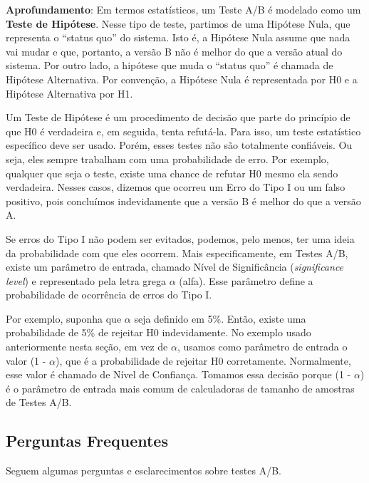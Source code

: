 \documentclass[
  11pt,
  twoside]{book}
\newenvironment{esmbox}{\centering \vspace{1.5ex} \begin{tcolorbox}[breakable, colback=backcolor, width=4.9in]}{\end{tcolorbox} \vspace{1.5ex}}
\begin{document}
\begin{esmbox}

\textbf{Aprofundamento}: Em termos estatísticos, um Teste A/B é modelado
como um \textbf{Teste de Hipótese}. Nesse tipo de teste, partimos de uma
Hipótese Nula, que representa o ``status quo'' do sistema. Isto é, a
Hipótese Nula assume que nada vai mudar e que, portanto, a versão B não
é melhor do que a versão atual do sistema. Por outro lado, a hipótese
que muda o ``status quo'' é chamada de Hipótese Alternativa. Por
convenção, a Hipótese Nula é representada por H0 e a Hipótese
Alternativa por H1.

Um Teste de Hipótese é um procedimento de decisão que parte do princípio
de que H0 é verdadeira e, em seguida, tenta refutá-la. Para isso, um
teste estatístico específico deve ser usado. Porém, esses testes não são
totalmente confiáveis. Ou seja, eles sempre trabalham com uma
probabilidade de erro. Por exemplo, qualquer que seja o teste, existe
uma chance de refutar H0 mesmo ela sendo verdadeira. Nesses casos,
dizemos que ocorreu um Erro do Tipo I ou um falso positivo, pois
concluímos indevidamente que a versão B é melhor do que a versão A.

Se erros do Tipo I não podem ser evitados, podemos, pelo menos, ter uma
ideia da probabilidade com que eles ocorrem. Mais especificamente, em
Testes A/B, existe um parâmetro de entrada, chamado Nível de
Significância (\emph{significance level}) e representado pela letra
grega \(\alpha\) (alfa). Esse parâmetro define a probabilidade de
ocorrência de erros do Tipo I.

Por exemplo, suponha que \(\alpha\) seja definido em 5\%. Então, existe
uma probabilidade de 5\% de rejeitar H0 indevidamente. No exemplo usado
anteriormente nesta seção, em vez de \(\alpha\), usamos como parâmetro
de entrada o valor (1 - \(\alpha\)), que é a probabilidade de rejeitar
H0 corretamente. Normalmente, esse valor é chamado de Nível de
Confiança. Tomamos essa decisão porque (1 - \(\alpha\)) é o parâmetro de
entrada mais comum de calculadoras de tamanho de amostras de Testes A/B.

\end{esmbox}

\hypertarget{perguntas-frequentes-6}{%
\subsection{Perguntas Frequentes}\label{perguntas-frequentes-6}}

Seguem algumas perguntas e esclarecimentos sobre testes A/B.
\end{document}

